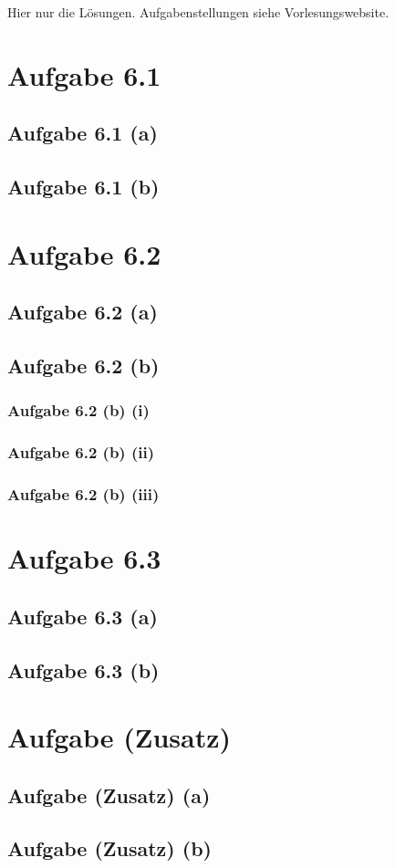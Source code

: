 \documentclass[12pt,a4paper]{article}
\author{Willi Sontopski}
\begin{document}

Hier nur die Lösungen. Aufgabenstellungen siehe Vorlesungswebsite.

\section*{Aufgabe 6.1}
\subsection*{Aufgabe 6.1 (a)}

\subsection*{Aufgabe 6.1 (b)}

\section*{Aufgabe 6.2}
\subsection*{Aufgabe 6.2 (a)}

\subsection*{Aufgabe 6.2 (b)}
\subsubsection*{Aufgabe 6.2 (b) (i)}
\subsubsection*{Aufgabe 6.2 (b) (ii)}
\subsubsection*{Aufgabe 6.2 (b) (iii)}

\section*{Aufgabe 6.3}
\subsection*{Aufgabe 6.3 (a)}

\subsection*{Aufgabe 6.3 (b)}

\section*{Aufgabe (Zusatz)}
\subsection*{Aufgabe (Zusatz) (a)}

\subsection*{Aufgabe (Zusatz) (b)}
\end{document}
